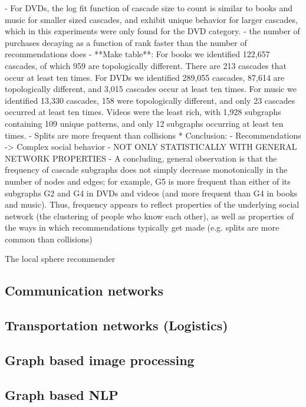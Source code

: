 	- For DVDs, the log fit function of cascade size to count is similar to books and music for smaller sized cascades, and exhibit unique behavior for larger cascades, which in this experiments were only found for the DVD category.
	- the number of purchases decaying as a function of rank faster than the number of recommendations does
	- **Make table**: For books we identified 122,657 cascades, of which 959 are topologically different. There are 213 cascades that occur at least ten times. For DVDs we identified 289,055 cascades, 87,614 are topologically different, and 3,015 cascades occur at least ten times. For music we identified 13,330 cascades, 158 were topologically different, and only 23 cascades occurred at least ten times. Videos were the least rich, with 1,928 subgraphs containing 109 unique patterns, and only 12 subgraphs occurring at least ten times.
	- Splits are more frequent than collisions
	* Conclusion:
	- Recommendations -> Complex social behavior
	- NOT ONLY STATISTICALLY WITH GENERAL NETWORK PROPERTIES
	- A concluding, general observation is that the frequency of cascade subgraphs does not simply decrease monotonically in the number of nodes and edges; for example, G5 is more frequent than either of its subgraphs G2 and G4 in DVDs and videos (and more frequent than G4 in books and music). Thus, frequency appears to reflect properties of the underlying social network (the clustering of people who know each other), as well as properties of the ways in which recommendations typically get made (e.g. splits are more common than collisions)
	
	The local sphere recommender
	
	\subsection{Communication networks}
	\label{ssect:app_communication_networks}
	
	\subsection{Transportation networks (Logistics)}
	\label{ssect:app_transportation_networks}
	
	\subsection{Graph based image processing}
	\label{ssect:app_graph_img_proc}
	
	\subsection{Graph based NLP}
	\label{ssect:app_graph_nlp}
	
